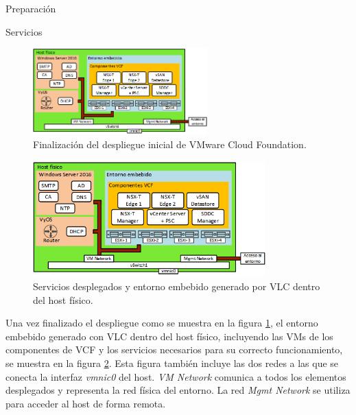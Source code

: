 \begin{subsection}{Preparación}
\begin{subsubsection}{Servicios}
  \end{subsubsection}
  \begin{figure}[h!]
    \centering
    \includegraphics[width=0.6\textwidth]{imaxes/pruebaconcepto/hostFisico.png}
    \caption{Finalización del despliegue inicial de VMware Cloud Foundation.}
    \label{fig:fin-despliegue}
  \end{figure}
  \FloatBarrier
    \begin{figure}[h!]
      \centering
      \includegraphics[width=0.8\textwidth]{imaxes/pruebaconcepto/hostFisico.png}
      \caption{Servicios desplegados y entorno embebido generado por VLC dentro del host físico.}
      \label{fig:estructura-generada-por-VLC}
    \end{figure}
    \FloatBarrier
    Una vez finalizado el despliegue como se muestra en la figura \ref{fig:fin-despliegue}, el entorno embebido generado con VLC dentro del host físico, incluyendo las VMs de los componentes de VCF y los servicios necesarios para su correcto funcionamiento, se muestra en la figura \ref{fig:estructura-generada-por-VLC}. Esta figura también incluye las dos redes a las que se conecta la interfaz \textit{vmnic0} del host. \textit{VM Network} comunica a todos los elementos desplegados y representa la red física del entorno. La red \textit{Mgmt Network} se utiliza para acceder al host de forma remota.


\end{subsection}
